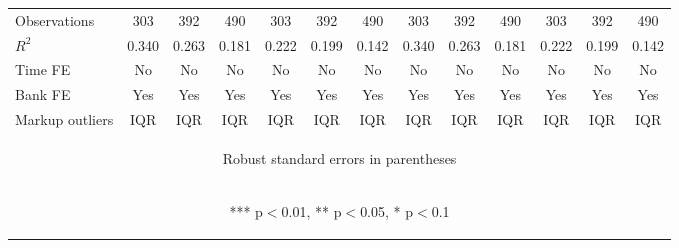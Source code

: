 \documentclass[]{article}
\begin{document}
\begin{center}
\begin{tabular}{lcccccccccccc}
Observations & 303 & 392 & 490 & 303 & 392 & 490 & 303 & 392 & 490 & 303 & 392 & 490 \\
$R^2$ & 0.340 & 0.263 & 0.181 & 0.222 & 0.199 & 0.142 & 0.340 & 0.263 & 0.181 & 0.222 & 0.199 & 0.142 \\
Time FE & No & No & No & No & No & No & No & No & No & No & No & No \\
Bank FE & Yes & Yes & Yes & Yes & Yes & Yes & Yes & Yes & Yes & Yes & Yes & Yes \\
 Markup outliers & IQR & IQR & IQR & IQR & IQR & IQR & IQR & IQR & IQR & IQR & IQR & IQR \\ \hline
\multicolumn{13}{c}{\begin{footnotesize} Robust standard errors in parentheses\end{footnotesize}} \\
\multicolumn{13}{c}{\begin{footnotesize} *** p$<$0.01, ** p$<$0.05, * p$<$0.1\end{footnotesize}} \\
\end{tabular}
\end{center}
\end{document}
